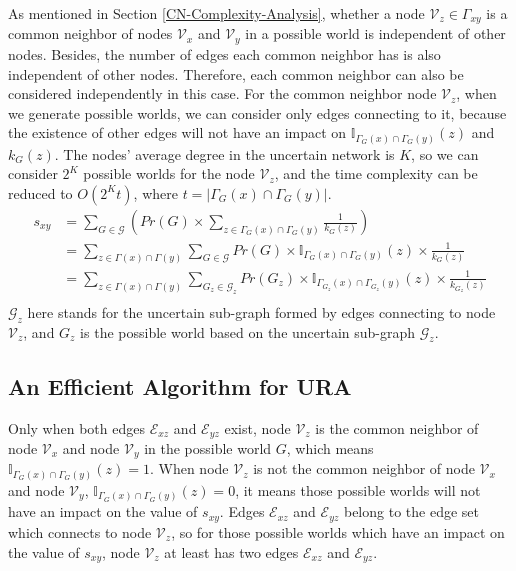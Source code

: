\documentclass[\main/thesis.tex]{subfiles}
\begin{document}
As mentioned in Section \ref{CN-Complexity-Analysis}, whether a node $\mathcal{V}_z \in \Gamma_{xy}$ is a common neighbor of nodes $\mathcal{V}_x$ and $\mathcal{V}_y$ in a possible world is independent of other nodes. Besides, the number of edges each common neighbor has is also independent of other nodes.  Therefore, each common neighbor can also be considered independently in this case. For the common neighbor node $\mathcal{V}_z$, when we generate possible worlds, we can consider only edges connecting to it, because the existence of other edges will not have an impact on $\mathbb{I}_{\Gamma_G(x)\cap\Gamma_G(y)}(z)$ and $k_G(z)$. The nodes' average degree in the uncertain network is $K$, so we can consider $2^K$ possible worlds for the node $\mathcal{V}_z$, and the time complexity can be reduced to $O(2^{K}t)$, where $t=|\Gamma_G(x)\cap\Gamma_G(y)|$. 
\begin{align*}
s_{xy}&=\sum_{G\in \mathcal{G}}( Pr(G)\times\sum_{z\in \Gamma_G(x)\cap\Gamma_G(y)}\frac{1}{k_G(z)})\\
&=\sum_{z\in \Gamma(x)\cap\Gamma(y)}\sum_{G\in \mathcal{G}}Pr(G)\times\mathbb{I}_{\Gamma_G(x)\cap\Gamma_G(y)}(z)\times \frac{1}{k_G(z)}\\
&=\sum_{z\in \Gamma(x)\cap\Gamma(y)}\sum_{{G_z}\in \mathcal{G}_z}Pr({G_z})\times\mathbb{I}_{\Gamma_{G_z}(x)\cap\Gamma_{G_z}(y)}(z)\times \frac{1}{k_{G_z}(z)}\\
\end{align*}
$\mathcal{G}_z$ here stands for the uncertain sub-graph formed by edges connecting to node $\mathcal{V}_z$, and $G_z$ is the possible world based on the uncertain sub-graph $\mathcal{G}_z$.

\subsection{An Efficient Algorithm for URA}

Only when both edges $\mathcal{E}_{xz}$ and $\mathcal{E}_{yz}$ exist, node $\mathcal{V}_z$ is the common neighbor of node $\mathcal{V}_x$ and node $\mathcal{V}_y$ in the possible world $G$, which means $\mathbb{I}_{\Gamma_G(x)\cap\Gamma_G(y)}(z)=1$. When node $\mathcal{V}_z$ is not the common neighbor of node $\mathcal{V}_x$ and node $\mathcal{V}_y$, $\mathbb{I}_{\Gamma_G(x)\cap\Gamma_G(y)}(z)=0$, it means those possible worlds will not have an impact on the value of $s_{xy}$. Edges $\mathcal{E}_{xz}$ and $\mathcal{E}_{yz}$ belong to the edge set which connects to node $\mathcal{V}_z$, so for those possible worlds which have an impact on the value of $s_{xy}$, node $\mathcal{V}_z$ at least has two edges $\mathcal{E}_{xz}$ and $\mathcal{E}_{yz}$.
\end{document}
